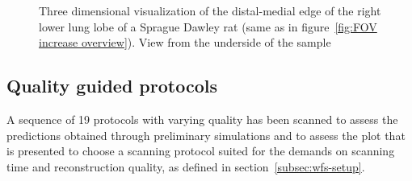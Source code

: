 \begin{figure}[htp]
{%
	}%
	\caption{Three dimensional visualization of the distal-medial edge of the right lower lung lobe of a Sprague Dawley rat (same as in figure~\ref{fig:FOV increase overview}). View from the underside of the sample}%
	\label{fig:FOV increase segments}%
\end{figure}

\subsection{Quality guided protocols}
\cbstart
A sequence of 19 protocols with varying quality has been scanned to assess the predictions obtained through preliminary simulations and to assess the plot that is presented to choose a scanning protocol suited for the demands on scanning time and reconstruction quality, as defined in section~\ref{subsec:wfs-setup}.

